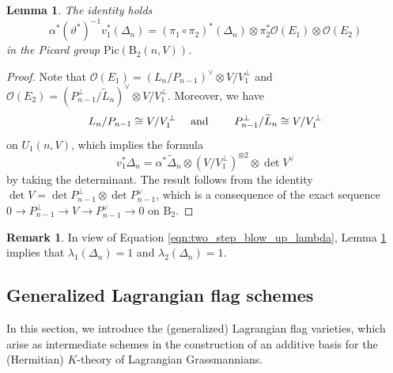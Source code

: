 \documentclass[a4paper]{amsart}
\theoremstyle{plain}
\newtheorem{lemma}[theorem]{Lemma}
\theoremstyle{definition}
\newtheorem{remark}[theorem]{Remark}
\numberwithin{equation}{section}
\newcommand{\Pic}{\mathrm{Pic}}
\newcommand{\Bl}{\mathrm{B}}
\newcommand{\SO}{\mathcal{O}}
\begin{document}
\begin{lemma}\label{lem:picard-bl} The identity holds
    \[
        \alpha^* (\vartheta^*)^{-1}  v_1^*(\Delta_{n}) = (\pi_1 \circ \pi_2)^*(\Delta_{n}) \otimes \pi_2^*\SO(E_1) \otimes \SO(E_2)
    \]
    in the Picard group $\Pic(\Bl_2(n,V))$.
\end{lemma}
\begin{proof}
    Note that    $\SO(E_1) = (L_n/P_{n-1})^\vee \otimes V/V_1^\perp$ and  $\SO(E_2) = (P_{n-1}^\perp/\widetilde{L}_{n})^\vee \otimes V/V_1^\perp$. Moreover, we have
    \[ L_n/P_{n-1} \cong V/V_1^\perp \quad \textnormal{ and }  \quad \quad P_{n-1}^\perp/\widetilde{L}_n \cong V/V_1^\perp \]
    on $U_1(n,V)$, which implies the formula
    \[v_1^*\Delta_n = \alpha^*\widetilde{\Delta}_n \otimes (V/V_1^\perp)^{\otimes 2} \otimes \det V^\vee\]
    by taking the determinant.
    The result follows from the identity $\det V = \det P_{n-1}^\perp \otimes \det P_{n-1}^\vee$, which is a consequence of the exact sequence $0 \to P_{n-1}^\perp \to V \to P_{n-1}^\vee \to 0$ on $\Bl_2$.
\end{proof}

\begin{remark}\label{rmk:lg_lambda}
    In view of Equation \eqref{eqn:two_step_blow_up_lambda}, Lemma \ref{lem:picard-bl} implies that $\lambda_1(\Delta_{n}) =1$ and $\lambda_2(\Delta_{n})=1$.
\end{remark}

\subsection{Generalized Lagrangian flag schemes}
In this section, we introduce the (generalized) Lagrangian flag varieties, which arise as intermediate schemes in the construction of an additive basis for the (Hermitian) $K$-theory of Lagrangian Grassmannians.
\end{document}
